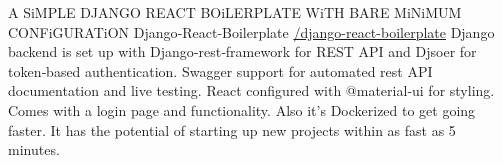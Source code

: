 \cventry
    {A SiMPLE DJANGO REACT BOiLERPLATE WiTH BARE MiNiMUM CONFiGURATiON} %
    {Django‑React‑Boilerplate} %
    {\href{https://github.com/mehedi-shafi/django-react-boilerplate}{\faGithubSquare/django-react-boilerplate}} %
    {} %
    {
      Django backend is set up with Django‑rest‑framework for REST API and Djsoer for token‑based authentication. Swagger support for automated rest API documentation and live testing. React configured with @material‑ui for styling. Comes with a login page and functionality. Also it’s Dockerized to get going faster. It has the potential of starting up new projects within as fast as 5 minutes.
    }